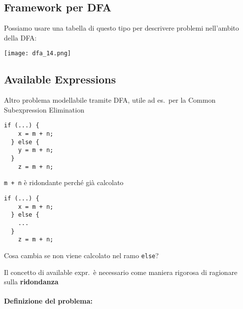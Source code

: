 \subsection{Framework per DFA}

Possiamo usare una tabella di questo tipo per descrivere problemi nell'ambito della DFA:

\begin{center}
  \texttt{[image: dfa\_14.png]}
\end{center}

\subsection{Available Expressions}

Altro problema modellabile tramite DFA, utile ad es.~per la Common Subexpression Elimination

\begin{center}
  \begin{minipage}[c]{.4\textwidth}
    \begin{lstlisting}[linewidth=.6\linewidth]
  if (...) {
    x = m + n;
  } else {
    y = m + n;
  }
    z = m + n;\end{lstlisting}
    \lstinline|m + n| \`e ridondante perch\'e gi\`a calcolato
  \end{minipage}\quad
  \begin{minipage}[c]{.5\textwidth}
    \begin{lstlisting}[linewidth=.48\linewidth]
  if (...) {
    x = m + n;
  } else {
    ...
  }
    z = m + n;\end{lstlisting}
    Cosa cambia se non viene calcolato nel ramo \lstinline|else|?
  \end{minipage}
\end{center}

Il concetto di available expr.~\`e necessario come maniera rigorosa di ragionare sulla \textbf{ridondanza}

\paragraph{Definizione del problema:}

